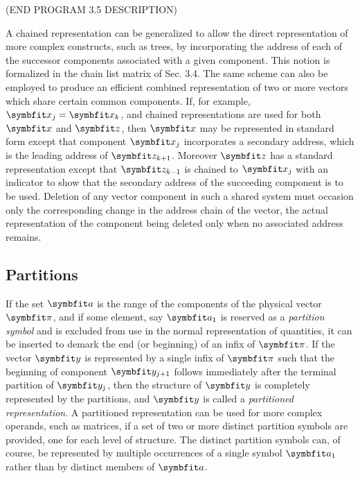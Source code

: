 \par (END PROGRAM 3.5 DESCRIPTION)

\par A chained representation can be generalized to allow the direct representation of more complex constructs, such as trees, by incorporating the address of each of the successor components associated with a given component. This notion is formalized in the chain list matrix of Sec. 3.4. The same scheme can also be employed to produce an efficient combined representation of two or more vectors which share certain common components. If, for example, $\vect{x}_j = \vect{x}_k$, and chained representations are used for both $\vect{x}$ and $\vect{z}$, then $\vect{x}$ may be represented in standard form except that component $\vect{x}_j$ incorporates a secondary address, which is the leading address of $\vect{z}_{k+1}$. Moreover $\vect{z}$ has a standard representation except that $\vect{z}_{k-1}$ is chained to $\vect{x}_j$ with an indicator to show that the secondary address of the succeeding component is to be used. Deletion of any vector component in such a shared system must occasion only the corresponding change in the address chain of the vector, the actual representation of the component being deleted only when no associated address remains.

\subsection*{Partitions}

\par If the set $\vect{a}$ is the range of the components of the physical vector $\vect{\pi}$, and if some element, say $\vect{a}_1$ is reserved as a \textit{partition symbol} and is excluded from use in the normal representation of quantities, it can be inserted to demark the end (or beginning) of an infix of $\vect{\pi}$. If the vector $\vect{y}$ is represented by a single infix of $\vect{\pi}$ such that the beginning of component $\vect{y}_{j+1}$ follows immediately after the terminal partition of $\vect{y}_j$, then the structure of $\vect{y}$ is completely represented by the partitions, and $\vect{y}$ is called a \textit{partitioned representation}. A partitioned representation can be used for more complex operands, such as matrices, if a set of two or more distinct partition symbols are provided, one for each level of structure. The distinct partition symbols can, of course, be represented by multiple occurrences of a single symbol $\vect{a}_1$ rather than by distinct members of $\vect{a}$.

